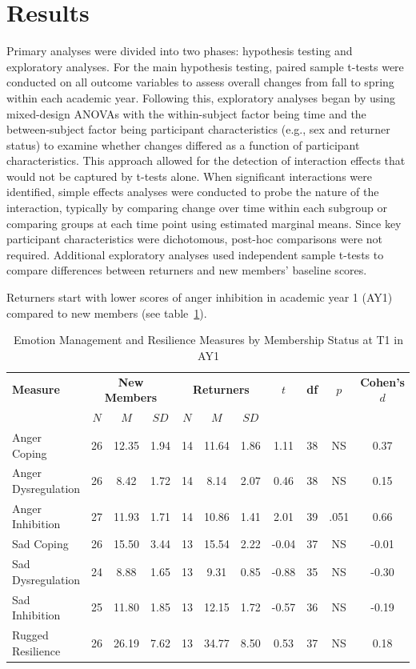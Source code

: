 \section{Results}

Primary analyses were divided into two phases: hypothesis testing and exploratory analyses. For the main hypothesis testing, paired sample t-tests were conducted on all outcome variables to assess overall changes from fall to spring within each academic year. Following this, exploratory analyses began by using mixed-design ANOVAs with the within-subject factor being time and the between-subject factor being participant characteristics (e.g., sex and returner status) to examine whether changes differed as a function of participant characteristics. This approach allowed for the detection of interaction effects that would not be captured by t-tests alone. When significant interactions were identified, simple effects analyses were conducted to probe the nature of the interaction, typically by comparing change over time within each subgroup or comparing groups at each time point using estimated marginal means. Since key participant characteristics were dichotomous, post-hoc comparisons were not required. Additional exploratory analyses used independent sample t-tests to compare differences between returners and new members’ baseline scores. 

Returners start with lower scores of anger inhibition in academic year 1 (AY1) compared to new members (see table~\ref{tab:T1Comparisons_AY1}).


\begin{table}[htbp]
\centering
\caption{Emotion Management and Resilience Measures by Membership Status at T1 in AY1}
\label{tab:T1Comparisons_AY1}
\begin{tabular}{lcccccccccc}
\hline
\textbf{Measure} & \multicolumn{3}{c}{\textbf{New Members}} & \multicolumn{3}{c}{\textbf{Returners}} & \textbf{$t$} & \textbf{df} & \textbf{$p$} & \textbf{Cohen's $d$} \\
\cline{2-4} \cline{5-7}
 & $N$ & $M$ & $SD$ & $N$ & $M$ & $SD$ & & & & \\ 
\hline
Anger Coping          & 26 & 12.35 & 1.94 & 14 & 11.64 & 1.86 & 1.11 & 38 & NS   & 0.37 \\
Anger Dysregulation   & 26 &  8.42 & 1.72 & 14 &  8.14 & 2.07 & 0.46 & 38 & NS   & 0.15 \\
Anger Inhibition      & 27 & 11.93 & 1.71 & 14 & 10.86 & 1.41 & 2.01 & 39 & .051 & 0.66 \\
Sad Coping            & 26 & 15.50 & 3.44 & 13 & 15.54 & 2.22 &-0.04 & 37 & NS   &-0.01 \\
Sad Dysregulation     & 24 &  8.88 & 1.65 & 13 &  9.31 & 0.85 &-0.88 & 35 & NS   &-0.30 \\
Sad Inhibition        & 25 & 11.80 & 1.85 & 13 & 12.15 & 1.72 &-0.57 & 36 & NS   &-0.19 \\
Rugged Resilience     & 26 & 26.19 & 7.62 & 13 & 34.77 & 8.50 & 0.53 & 37 & NS   & 0.18 \\
\hline
\end{tabular}
\end{table}

